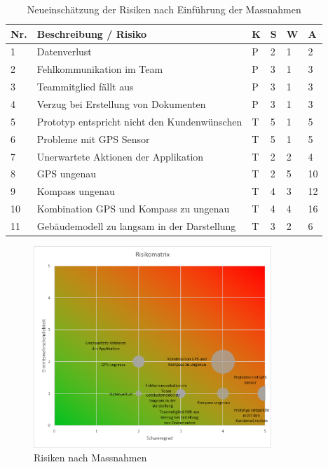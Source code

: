 \documentclass[a4paper]{scrreprt}
\begin{document}
\begin{table}[htb]
	\begin{tabularx}{\textwidth}{|l|X|l|l|l||l|}
		\hline
		\textbf{Nr.} & \textbf{Beschreibung / Risiko} & \textbf{K} & \textbf{S} & \textbf{W} & \textbf{A} \\
		\hline
		1 & Datenverlust & P & 2 & 1 & 2\\
		\hline
		2 & Fehlkommunikation im Team & P & 3 & 1 & 3 \\
		\hline
		3 & Teammitglied fällt aus & P & 3 & 1 & 3 \\
		\hline
		4 & Verzug bei Erstellung von Dokumenten & P & 3 & 1 & 3 \\
		\hline
		5 & Prototyp entspricht nicht den Kundenwünschen & T & 5 & 1 & 5 \\
		\hline
		6 & Probleme mit GPS Sensor & T & 5 & 1 & 5 \\
		\hline
		7 & Unerwartete Aktionen der Applikation & T & 2 & 2 & 4\\
		\hline
		8 & GPS ungenau & T & 2 & 5 & 10\\
		\hline
		9 & Kompass ungenau & T & 4 & 3 & 12\\
		\hline
		10 & Kombination GPS und Kompass zu ungenau & T & 4 & 4 & 16\\
		\hline
		11 & Gebäudemodell zu langsam in der Darstellung & T & 3 & 2 & 6\\
		\hline
	\end{tabularx}
	\caption{Neueinschätzung der Risiken nach Einführung der Massnahmen}
\end{table}

\vspace{1em}

\begin{figure}[h!]
	\centering
	\includegraphics[keepaspectratio, width=0.8\textwidth]{RisikoMatrix_nach_Massnahmen}
	\caption{Risiken nach Massnahmen}
\end{figure}
\end{document}

